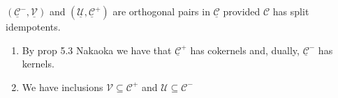 \begin{corollary}
  $(\underline{\mathcal{C}}^-,\underline{\mathcal{V}})$ and $(\underline{\mathcal{U}},\underline{\mathcal{C}}^+)$ are orthogonal
  pairs in $\underline{\mathcal{C}}$ provided $\mathcal{C}$ has split idempotents.
\end{corollary}

\begin{rmk}
  \begin{enumerate}
    \item By prop 5.3 Nakaoka  we have that $\underline{\mathcal{C}}^+$ has cokernels and,
    dually, $\underline{\mathcal{C}}^-$ has kernels.
    \item We have inclusions $\mathcal{V}\subseteq \mathcal{C}^+$ and $\mathcal{U}\subseteq\mathcal{C}^-$ 
  \end{enumerate}
\end{rmk}
